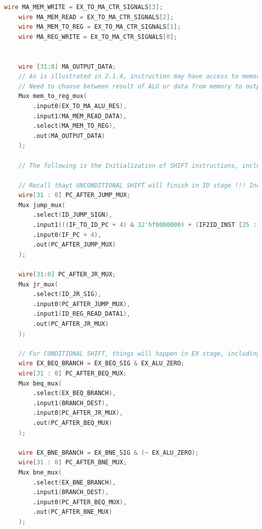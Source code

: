 \begin{lstlisting}[language=Verilog]
    wire MA_MEM_WRITE = EX_TO_MA_CTR_SIGNALS[3];
    wire MA_MEM_READ = EX_TO_MA_CTR_SIGNALS[2];
    wire MA_MEM_TO_REG = EX_TO_MA_CTR_SIGNALS[1];
    wire MA_REG_WRITE = EX_TO_MA_CTR_SIGNALS[0];

    
    wire [31:0] MA_OUTPUT_DATA;
    // As is illustrated in 2.1.4, instruction may have access to memory in MA stage
    // Need to choose between result of ALU or data from memory to output
    Mux mem_to_reg_mux(
        .input0(EX_TO_MA_ALU_RES),
        .input1(MA_MEM_READ_DATA),
        .select(MA_MEM_TO_REG),
        .out(MA_OUTPUT_DATA)
    );

    // The following is the Initialization of SHIFT instructions, including JUMP, JR, BNE, BEQ

    // Recall thayt UNCONDITIONAL SHIFT will finish in ID stage !!! Including J and JR !
    wire[31 : 0] PC_AFTER_JUMP_MUX;
    Mux jump_mux(
        .select(ID_JUMP_SIGN), 
        .input1(((IF_TO_ID_PC + 4) & 32'hf0000000) + (IF2ID_INST [25 : 0] << 2)),
        .input0(IF_PC + 4),
        .out(PC_AFTER_JUMP_MUX)
    );
    
    wire[31:0] PC_AFTER_JR_MUX;
    Mux jr_mux(
        .select(ID_JR_SIG),   
        .input0(PC_AFTER_JUMP_MUX),
        .input1(ID_REG_READ_DATA1),
        .out(PC_AFTER_JR_MUX)
    );
    
    // For CONDITIONAL SHIFT, things will happen in EX stage, including BEQ and BNE 
    wire EX_BEQ_BRANCH = EX_BEQ_SIG & EX_ALU_ZERO;
    wire[31 : 0] PC_AFTER_BEQ_MUX;
    Mux beq_mux(
        .select(EX_BEQ_BRANCH),
        .input1(BRANCH_DEST),
        .input0(PC_AFTER_JR_MUX),
        .out(PC_AFTER_BEQ_MUX)
    );
    
    wire EX_BNE_BRANCH = EX_BNE_SIG & (~ EX_ALU_ZERO);
    wire[31 : 0] PC_AFTER_BNE_MUX;
    Mux bne_mux(
        .select(EX_BNE_BRANCH),
        .input1(BRANCH_DEST),
        .input0(PC_AFTER_BEQ_MUX),
        .out(PC_AFTER_BNE_MUX)
    );
\end{lstlisting}


